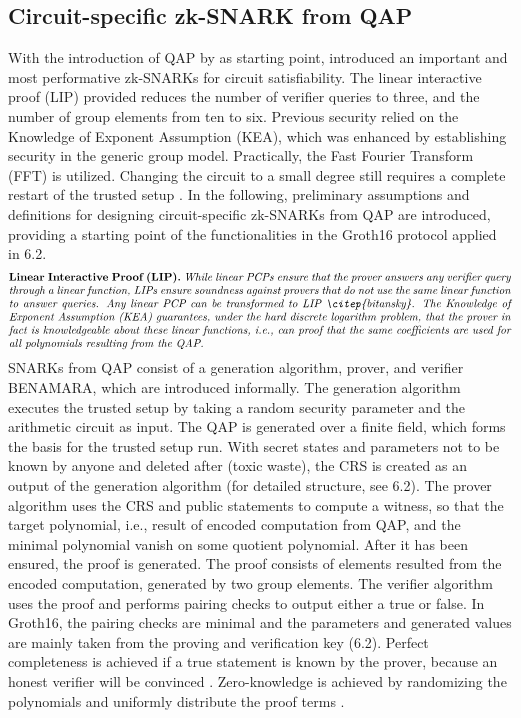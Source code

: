 \subsection{Circuit-specific zk-SNARK from QAP}
With the introduction of QAP by \citet{GennaroLinPCP} as starting point, \citet{Groth2016OnTS} introduced an important and most performative zk-SNARKs for circuit satisfiability. The linear interactive proof (LIP) provided reduces the number of verifier queries to three, and the number of group elements from ten to six. Previous security relied on the Knowledge of Exponent Assumption (KEA), which was enhanced by establishing security in the generic group model. Practically, the Fast Fourier Transform (FFT) is utilized. Changing the circuit to a small degree still requires a complete restart of the trusted setup \citep{Thaler}. In the following, preliminary assumptions and definitions for designing circuit-specific zk-SNARKs from QAP are introduced, providing a starting point of the functionalities in the Groth16 protocol applied in 6.2.
\begin{align*}
    \text{\parbox{450pt}{\textbf{Linear Interactive Proof (LIP).} \textit{While linear PCPs ensure that the prover answers any verifier query through a linear function, LIPs ensure soundness against provers that do not use the same linear function to answer queries. Any linear PCP can be transformed to LIP \citep{bitansky}. The Knowledge of Exponent Assumption (KEA) guarantees, under the hard discrete logarithm problem, that the prover in fact is knowledgeable about these linear functions, i.e., can proof that the same coefficients are used for all polynomials resulting from the QAP.}}}
\end{align*}
SNARKs from QAP consist of a generation algorithm, prover, and verifier \citep{Groth2016OnTS, Guo}BENAMARA, which are introduced informally.
The generation algorithm executes the trusted setup by taking a random security parameter and the arithmetic circuit as input. The QAP is generated over a finite field, which forms the basis for the trusted setup run. With secret states and parameters not to be known by anyone and deleted after (toxic waste), the CRS is created as an output of the generation algorithm (for detailed structure, see 6.2). The prover algorithm uses the CRS and public statements to compute a witness, so that the target polynomial, i.e., result of encoded computation from QAP, and the minimal polynomial vanish on some quotient polynomial. After it has been ensured, the proof is generated. The proof consists of elements resulted from the encoded computation, generated by two group elements. The verifier algorithm uses the proof and performs pairing checks to output either a true or false. In Groth16, the pairing checks are minimal and the parameters and generated values are mainly taken from the proving and verification key (6.2). Perfect completeness is achieved if a true statement is known by the prover, because an honest verifier will be convinced \citep{Guo}. Zero-knowledge is achieved by randomizing the polynomials and uniformly distribute the proof terms \citep{Groth2016OnTS, Groth2010ShortPN}.

